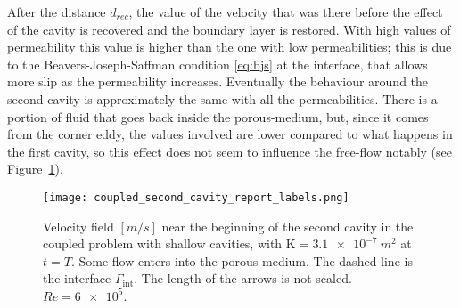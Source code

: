 After the distance $d_{rec}$, the value of the velocity that was there 
before the effect of the cavity is recovered and the boundary layer is 
restored. With high values of permeability this value is higher than the one 
with low permeabilities; this is due to the Beavers-Joseph-Saffman condition 
\eqref{eq:bjs} at the interface, that allows more slip as the permeability 
increases. Eventually the behaviour around the 
second cavity is approximately the same with all the permeabilities. There is a 
portion of fluid that goes back inside the porous-medium, but, since it comes 
from the corner eddy, the values involved are lower compared to what happens in 
the first cavity, so this effect does not seem to influence the free-flow 
notably (see Figure~\ref{fig:coupledsecondcav}).
\begin{figure}
	\centering
	\texttt{[image: coupled\_second\_cavity\_report\_labels.png]}
	\caption[Velocity field near the beginning of the second cavity in the coupled problem with shallow cavities]{Velocity field $[\si{m/s}]$ near the beginning of the second cavity in the coupled problem with shallow cavities, with $\mathrm{K}=\SI{3.1e-7}{m^2}$ at $t=T$. Some flow enters into the porous medium. The dashed line is the interface $\Gamma_\text{int}$. The length of the arrows is not scaled. $Re=\num{6e5}$.}
	\label{fig:coupledsecondcav}
\end{figure}

